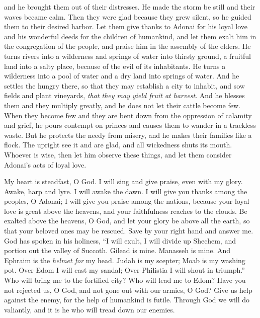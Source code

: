 \begin{biblechapter}
and he brought them out of their distresses.
\verse He made the storm be still 
and their waves became calm.
\verse Then they were glad because they grew silent, 
so he guided them to their desired harbor.
\verse Let them give thanks to Adonai for his loyal love 
and his wonderful deeds for the children of humankind,
\verse and let them exalt him in the congregation of the people, 
and praise him in the assembly of the elders.
\verse He turns rivers into a wilderness 
and springs of water into thirsty ground,
\verse a fruitful land into a salty place, 
because of the evil of its inhabitants.
\verse He turns a wilderness into a pool of water 
and a dry land into springs of water.
\verse And he settles the hungry there, 
so that they may establish a city to inhabit,
\verse and sow fields and plant vineyards, 
\textit{that they may yield fruit at harvest}.
\verse And he blesses them and they multiply greatly, 
and he does not let their cattle become few.
\verse When they become few and they are bent down 
from the oppression of calamity and grief,
\verse he pours contempt on princes 
and causes them to wander in a trackless waste.
\verse But he protects the needy from misery, 
and he makes their families like a flock.
\verse The upright see it and are glad, 
and all wickedness shuts its mouth.
\verse Whoever is wise, then let him observe these things, 
and let them consider Adonai’s acts of loyal love.
\end{biblechapter}

\begin{biblechapter} %
 My heart is steadfast, O God. 
I will sing and give praise, even with my glory.
\verse Awake, harp and lyre. 
I will awake the dawn.
\verse I will give you thanks among the peoples, O Adonai; 
I will give you praise among the nations,
\verse because your loyal love is great above the heavens, 
and your faithfulness reaches to the clouds.
\verse Be exalted above the heavens, O God, 
and let your glory be above all the earth,
\verse so that your beloved ones may be rescued. 
Save by your right hand and answer me.
\verse God has spoken in his holiness, 
“I will exult, I will divide up Shechem, 
and portion out the valley of Succoth.
\verse Gilead is mine. Manasseh is mine. 
And Ephraim is the \textit{helmet for} my head. 
Judah is my scepter;
\verse Moab is my washing pot. 
Over Edom I will cast my sandal; 
Over Philistia I will shout in triumph.”
\verse Who will bring me to the fortified city? 
Who will lead me to Edom?
\verse Have you not rejected us, O God, 
and not gone out with our armies, O God?
\verse Give us help against the enemy, 
for the help of humankind is futile.
\verse Through God we will do valiantly, 
and it is he who will tread down our enemies.
\end{biblechapter}


